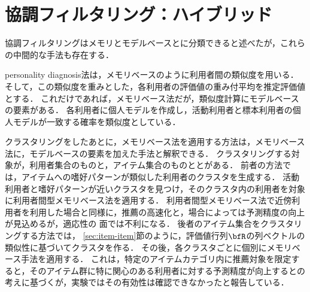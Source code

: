 \chapter{協調フィルタリング：ハイブリッド}
\label{chap:hybridcf}

協調フィルタリングはメモリとモデルベースとに分類できると述べたが，これらの中間的な手法も存在する．

personality diagnosis法\cite{uai:00:01}は，メモリベースのように利用者間の類似度を用いる．
そして，この類似度を重みとした，各利用者の評価値の重み付平均を推定評価値とする．
これだけであれば，メモリベース法だが，類似度計算にモデルベースの要素がある．
各利用者に個人モデルを作成し，活動利用者と標本利用者の個人モデルが一致する確率を類似度としている．

クラスタリングをしたあとに，メモリベース法を適用する方法は，メモリベース法に，モデルベースの要素を加えた手法と解釈できる．
クラスタリングする対象が，利用者集合のもの\cite{sigir:05:01}と，アイテム集合のものと\cite{misc:090}とがある．
前者の方法では，アイテムへの嗜好パターンが類似した利用者のクラスタを生成する．
活動利用者と嗜好パターンが近いクラスタを見つけ，そのクラスタ内の利用者を対象に利用者間型メモリベース法を適用する．
利用者間型メモリベース法で近傍利用者を利用した場合と同様に，推薦の高速化と，場合によっては予測精度の向上が見込めるが，適応性の
面では不利になる．
後者のアイテム集合をクラスタリングする方法では，
\ref{sec:item-item}節のように，評価値行列$\bfR$の列ベクトルの類似性に基づいてクラスタを作る．
その後，各クラスタごとに個別にメモリベース手法を適用する．
これは，特定のアイテムカテゴリ内に推薦対象を限定すると，そのアイテム群に特に関心のある利用者に対する予測精度が向上するとの考えに基づくが，実験ではその有効性は確認できなかったと報告している．


